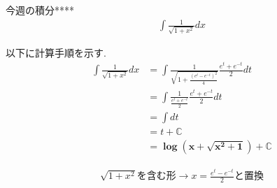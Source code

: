 \documentclass[main]{subfiles}
\begin{document}

\begin{mondai}{6}{今週の積分}{****}
    \begin{align*}
        \int \frac{1}{\sqrt{1+x^2}} dx
    \end{align*}
\end{mondai}


\solutionhead
\hfill
以下に計算手順を示す.
\hfill\
\begin{align*}
    \int \frac{1}{\sqrt{1+x^2}} dx
        &= \int \frac{1}{\sqrt{1+\frac{\left(e^t-e^{-t}\right)^2}{4}}} \frac{e^t+e^{-t}}{2}dt \\
        &= \int \frac{1}{\frac{e^t+e^{-t}}{2}}\frac{e^t+e^{-t}}{2} dt \\
        &= \int dt \\
        &= t+\mathbb{C} \\
        &= \boldsymbol{\log \left(x+\sqrt{x^2+1}\right)+\mathbb{C}}
\end{align*}

\begin{focusbox}
\centering
\vspace*{-0.9\baselineskip}
\begin{align*}
    \sqrt{1+x^2}\text{を含む形}\rightarrow x=\frac{e^t-e^{-t}}{2} \text{と置換}
\end{align*}
\end{focusbox}
\end{document}
